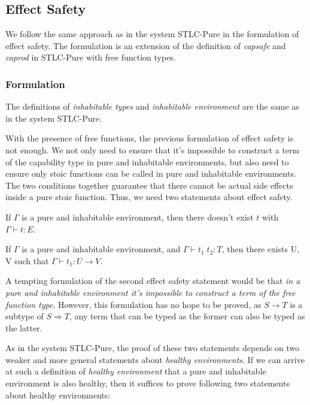 \subsection{Effect Safety}

We follow the same approach as in the system STLC-Pure in the
formulation of effect safety. The formulation is an extension of the
definition of \emph{capsafe} and \emph{caprod} in STLC-Pure with free
function types.

\subsubsection{Formulation}

The definitions of \emph{inhabitable types} and \emph{inhabitable
  environment} are the same as in the system STLC-Pure.

With the presence of free functions, the previous formulation of
effect safety is not enough. We not only need to ensure that it's
impossible to construct a term of the capability type in pure and
inhabitable environments, but also need to ensure only stoic functions
can be called in pure and inhabitable environments. The two conditions
together guarantee that there cannot be actual side effects inside a
pure stoic function. Thus, we need two statements about effect safety.

\begin{definition}
  If $\Gamma$ is a pure and inhabitable environment, then there
  doesn't exist $t$ with $\Gamma \vdash t : E$.
\end{definition}

\begin{definition}
  If $\Gamma$ is a pure and inhabitable environment, and
  $\Gamma \vdash t_1 \; t_2 : T$, then there exists U, V such that
  $\Gamma \vdash t_1 : U \to V$.
\end{definition}

A tempting formulation of the second effect safety statement would be
that \emph{in a pure and inhabitable environment it's impossible to
  construct a term of the free function type}. However, this
formulation has no hope to be proved, as $S \to T$ is a subtype of
$S \Rightarrow T$, any term that can be typed as the former can also
be typed as the latter.

As in the system STLC-Pure, the proof of these two statements depends
on two weaker and more general statements about \emph{healthy
  environments}. If we can arrive at such a definition of
\emph{healthy environment} that a pure and inhabitable environment is
also healthy, then it suffices to prove following two statements about
healthy environments:

